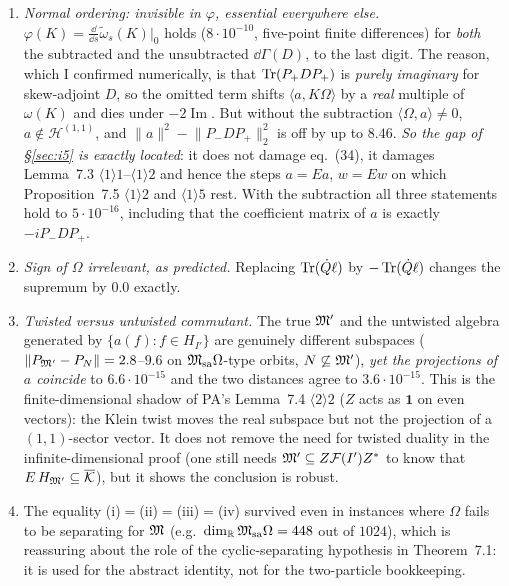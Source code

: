 \documentclass[11pt]{article}
\newcommand{\Pp}{P_+}\newcommand{\Pm}{P_-}
\providecommand{\Om}{\Omega}\providecommand{\Gm}{\Gamma}\providecommand{\Qt}{\widetilde Q}
\providecommand{\Msa}{\cM_{\mathrm{sa}}}\providecommand{\Mpsa}{\cM'_{\mathrm{sa}}}
\providecommand{\norm}[1]{\lVert #1\rVert}\providecommand{\abs}[1]{\lvert #1\rvert}
\providecommand{\ip}[2]{\langle #1,#2\rangle}\providecommand{\one}{\mathbf 1}
\begin{document}
\begin{enumerate}[label=(\alph*),leftmargin=2em]
\item \emph{Normal ordering: invisible in $\varphi$, essential everywhere else.}  $\varphi(K)=
 \frac{\dd}{\dd s}\widetilde\omega_s(K)|_0$ holds ($8\cdot10^{-10}$, five-point finite differences)
 for \emph{both} the subtracted and the unsubtracted $\dd\Gm(D)$, to the last digit.  The reason,
 which I confirmed numerically, is that $\Tr(\Pp D\Pp)$ is \emph{purely imaginary} for skew-adjoint
 $D$, so the omitted term shifts $\ip a{K\Om}$ by a \emph{real} multiple of $\omega(K)$ and dies
 under $-2\operatorname{Im}$.  But without the subtraction $\ip\Om{a}\ne0$, $a\notin\mathcal
 H^{(1,1)}$, and $\norm a^2-\norm{\Pm D\Pp}_2^2$ is off by up to $8.46$.  \emph{So the gap of
 \S\ref{sec:i5} is exactly located}: it does not damage eq.~(34), it damages Lemma~7.3
 $\langle1\rangle1$--$\langle1\rangle2$ and hence the steps $a=Ea$, $w=Ew$ on which
 Proposition~7.5 $\langle1\rangle2$ and $\langle1\rangle5$ rest.  With the subtraction all three
 statements hold to $5\cdot10^{-16}$, including that the coefficient matrix of $a$ is exactly
 $-i\Pm D\Pp$.
\item \emph{Sign of $\Omega$ irrelevant, as predicted.}  Replacing $\operatorname{Tr}(\dot Q\ell)$ by
 $-\operatorname{Tr}(\dot Q\ell)$ changes the supremum by $0.0$ exactly.
\item \emph{Twisted versus untwisted commutant.}  The true $\mathfrak M'$ and the untwisted algebra
 generated by $\{a(f):f\in H_{I'}\}$ are genuinely different subspaces
 ($\norm{P_{\cM'}-P_{N}}=2.8$--$9.6$ on $\Msa\Om$-type orbits, $N\not\subseteq\mathfrak M'$), \emph{yet the
 projections of $a$ coincide} to $6.6\cdot10^{-15}$ and the two distances agree to
 $3.6\cdot10^{-15}$.  This is the finite-dimensional shadow of PA's Lemma~7.4 $\langle2\rangle2$
 ($Z$ acts as $\one$ on even vectors): the Klein twist moves the real subspace but not the
 projection of a $(1,1)$-sector vector.  It does not remove the need for twisted duality in the
 infinite-dimensional proof (one still needs $\mathfrak M'\subseteq Z\mathcal F(I')Z^*$ to know that
 $E\,H_{\mathfrak M'}\subseteq\overline{\mathcal K}$), but it shows the conclusion is robust.
\item The equality (i)$=$(ii)$=$(iii)$=$(iv) survived even in instances where $\Om$ fails to be
 separating for $\mathfrak M$ (e.g.\ $\dim_{\mathbb R}\Msa\Om=448$ out of $1024$), which is reassuring about
 the role of the cyclic-separating hypothesis in Theorem~7.1: it is used for the abstract identity,
 not for the two-particle bookkeeping.
\end{enumerate}
\end{document}
